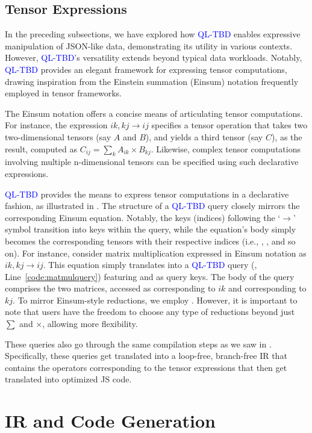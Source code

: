\documentclass[runningheads]{llncs}
\newcommand{\lang}{\textcolor{blue}{QL-TBD}}
\begin{document}
\subsection{Tensor Expressions}
In the preceding subsections, we have explored how \lang{} enables expressive
manipulation of JSON-like data, demonstrating its utility in various contexts.
However, \lang{}'s versatility extends beyond typical data workloads.
Notably, \lang{} provides an elegant framework for expressing tensor computations,
drawing inspiration from the Einstein summation (Einsum) notation frequently
employed in tensor frameworks.

The Einsum notation offers a concise means of articulating tensor computations.
For instance, the expression $ik,kj \rightarrow ij$ specifies a tensor operation
that takes two two-dimensional tensors (say $A$ and $B$), and yields a third
tensor (say $C$), as the result, computed as $C_{ij} = \sum_k A_{ik} \times B_{kj}$.
Likewise, complex tensor computations involving multiple n-dimensional tensors can
be specified using such declarative expressions.

\lang{} provides the means to express tensor computations in a declarative fashion,
as illustrated in .
The structure of a \lang{} query closely mirrors the corresponding Einsum equation.
Notably, the keys (indices) following the `$\rightarrow$' symbol transition into keys
within the query, while the equation's body simply becomes the corresponding tensors
with their respective indices (i.e., , , and so on).
For instance, consider matrix multiplication expressed in Einsum notation as
$ik,kj \rightarrow ij$.
This equation simply translates into a \lang{} query (, Line~\ref{code:matmulquery}) featuring  and
 as query keys. The body of the query comprises the two matrices, accessed as
 corresponding to $ik$ and  corresponding to $kj$.
To mirror Einsum-style reductions, we employ .
However, it is important to note that users have the freedom to choose
any type of reductions beyond just $\sum$ and $\times$, allowing more flexibility.

These queries also go through the same compilation steps as we saw in .
Specifically, these queries get translated into a loop-free, branch-free IR that contains the
operators corresponding to the tensor expressions that then get translated into
optimized JS code.

\section{IR and Code Generation}~\label{sec:ir_codegen}
\end{document}
